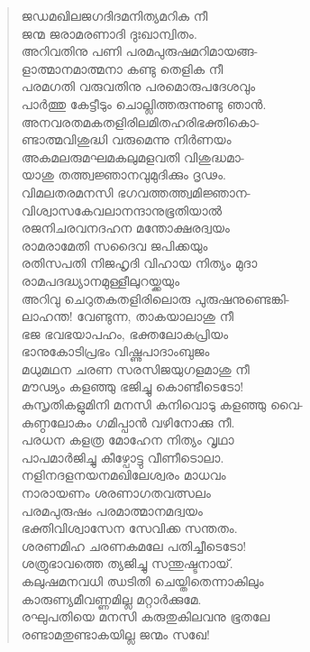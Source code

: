 \begin{verse}
ജഡമഖിലജഗദിദമനിത്യമറിക നീ\\
ജന്മ ജരാമരണാദി ദുഃഖാന്വിതം.\\
അറിവതിനു പണി പരമപുരുഷമറിമായങ്ങ-\\
ളാത്മാനമാത്മനാ കണ്ടു തെളിക നീ\\
പരമഗതി വരുവതിനു പരമൊരുപദേശവും\\
പാര്‍ത്തു കേട്ടീടും ചൊല്ലിത്തരുന്നുണ്ടു ഞാന്‍.\\
അനവരതമകതളിരിലമിതഹരിഭക്തികൊ-\\
ണ്ടാത്മവിശുദ്ധി വരുമെന്നു നിര്‍ണയം\\
അകമലരുമഘമകലുമളവതി വിശുദ്ധമാ-\\
യാശു തത്ത്വജ്ഞാനവുമുദിക്കും ദൃഢം.\\
വിമലതരമനസി ഭഗവത്തത്ത്വമിജ്ഞാന-\\
വിശ്വാസകേവലാനന്ദാനുഭൂതിയാല്‍\\
രജനിചരവനദഹന മന്തോക്ഷരദ്വയം\\
രാമരാമേതി സദൈവ ജപിക്കയും\\
രതിസപതി നിജഹൃദി വിഹായ നിത്യം മുദാ\\
രാമപദദ്ധ്യാനമുള്ളീലുറയ്ക്കയും\\
അറിവു ചെറുതകതളിരിലൊരു പുരുഷനുണ്ടെങ്കി-\\
ലാഹന്ത! വേണ്ടുന്ന, താകയാലാശു നീ\\
ഭജ ഭവഭയാപഹം, ഭക്തലോകപ്രിയം\\
ഭാനുകോടിപ്രഭം വിഷ്ണുപാദാംബുജം\\
മധുമഥന ചരണ സരസിജയുഗളമാശു നീ\\
മൗഢ്യം കളഞ്ഞു ഭജിച്ചു കൊണ്ടീടെടോ!\\
കുസൃതികളുമിനി മനസി കനിവൊടു കളഞ്ഞു വൈ-\\
കുണ്ഠലോകം ഗമിപ്പാന്‍ വഴിനോക്കു നീ.\\
പരധന കളത്ര മോഹേന നിത്യം വൃഥാ\\
പാപമാര്‍ജിച്ചു കീഴ്പോട്ടു വീണീടൊലാ.\\
നളിനദളനയനമഖിലേശ്വരം മാധവം\\
നാരായണം ശരണാഗതവത്സലം\\
പരമപുരുഷം പരമാത്മാനമദ്വയം\\
ഭക്തിവിശ്വാസേന സേവിക്ക സന്തതം.\\
ശരണമിഹ ചരണകമലേ പതിച്ചീടെടോ!\\
ശത്രുഭാവത്തെ ത്യജിച്ചു സന്തുഷ്ടനായ്.\\
കലുഷമനവധി ഝടിതി ചെയ്തിതെന്നാകിലും\\
കാരുണ്യമീവണ്ണമില്ല മറ്റാര്‍ക്കുമേ.\\
രഘുപതിയെ മനസി കരുതുകിലവനു ഭൂതലേ\\
രണ്ടാമതുണ്ടാകയില്ല ജന്മം സഖേ!\\

\end{verse}
